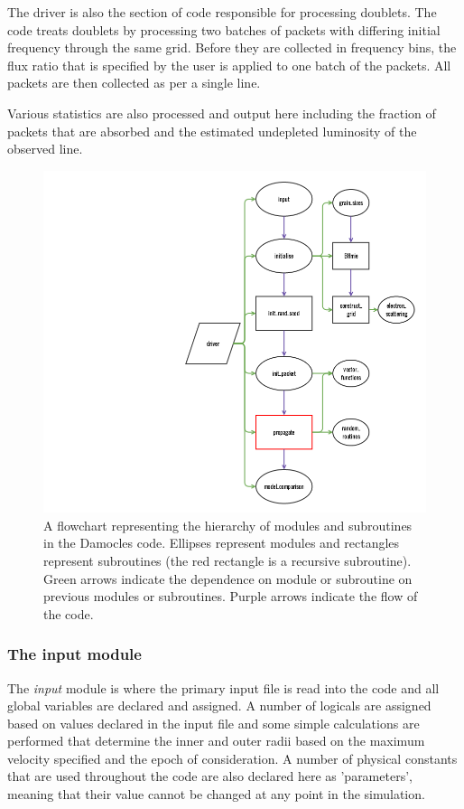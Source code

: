 		The driver is also the section of code responsible for processing doublets.  The code treats doublets by processing two batches of packets with differing initial frequency through the same grid.  Before they are collected in frequency bins, the flux ratio that is specified by the user is applied to one batch of the packets.  All packets are then collected as per a single line. 
		
		Various statistics are also processed and output here including the fraction of packets that are absorbed and the estimated undepleted luminosity of the observed line. 
		
			\begin{centering}
	\begin{figure}
	\includegraphics[scale=0.8, trim=110mm 0mm 0mm 5mm]{chapters/chapter2/code_modules_flowchart.png}
	\caption{A flowchart representing the hierarchy of modules and subroutines in the Damocles code.  Ellipses represent modules and rectangles represent subroutines (the red rectangle is a recursive subroutine).  Green arrows indicate the dependence on module or subroutine on previous modules or subroutines.  Purple arrows indicate the flow of the code.}
	\label{fig:flowchart_mods}
	\end{figure}
	\end{centering}
		
		\subsubsection{The input module}
		The \textit{input} module is where the primary input file is read into the code and all global variables are declared and assigned.  A number of logicals are assigned based on values declared in the input file and some simple calculations are performed that determine the inner and outer radii based on the maximum velocity specified and the epoch of consideration.  A number of physical constants that are used throughout the code are also declared here as 'parameters', meaning that their value cannot be changed at any point in the simulation.
		
